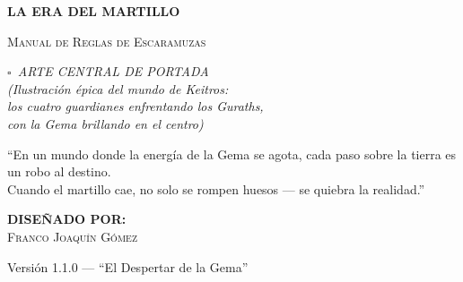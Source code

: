 \begin{titlepage}
    \centering

    \vspace*{1.5cm}

    \noindent\makebox[\linewidth]{\rule{\textwidth}{3pt}}
    \vspace{0.2cm}
    \noindent\makebox[\linewidth]{\rule{\textwidth}{0.5pt}}
    \vspace{0.5cm}

    {\fontsize{44}{50}\selectfont \bfseries \color{HammerRed} LA ERA DEL MARTILLO \par}

    \vspace{0.3cm}
    {\Large \scshape\color{IronGray} Manual de Reglas de Escaramuzas \par}
    \vspace{0.5cm}

    \noindent\makebox[\linewidth]{\rule{\textwidth}{0.5pt}}
    \vspace{0.2cm}
    \noindent\makebox[\linewidth]{\rule{\textwidth}{3pt}}

    \vspace{1.5cm}

    \begin{tcolorbox}[
        enhanced,
        colback=DeepBlack!90,
        colframe=GoldRule,
        width=0.85\textwidth,
        height=10cm,
        halign=center,
        valign=center,
        arc=0mm
    ]
        {\color{GoldRule} \fontsize{11}{13}\selectfont \itshape
        $\square$\ ARTE CENTRAL DE PORTADA \\[6pt]
        \small (Ilustración épica del mundo de Keitros:\\ los cuatro guardianes enfrentando los Guraths,\\ con la Gema brillando en el centro)
        }
    \end{tcolorbox}

    \vspace{0.8cm}

    \begin{loreblock}
        \centering
        \large ``En un mundo donde la energía de la Gema se agota, cada paso sobre la tierra es un robo al destino.\\
        Cuando el martillo cae, no solo se rompen huesos — se quiebra la realidad.''
    \end{loreblock}

    \vfill

    \begin{tcolorbox}[colframe=GoldRule, colback=DeepBlack!95, arc=0mm, width=0.75\textwidth]
        \centering
        {\color{white} \large \textbf{DISEÑADO POR:} \\ \scshape Franco Joaquín Gómez}
    \end{tcolorbox}

    \vspace{0.8cm}
    {\small \color{IronGray} Versión 1.1.0 — ``El Despertar de la Gema'' \\ \the\year \par}

\end{titlepage}
